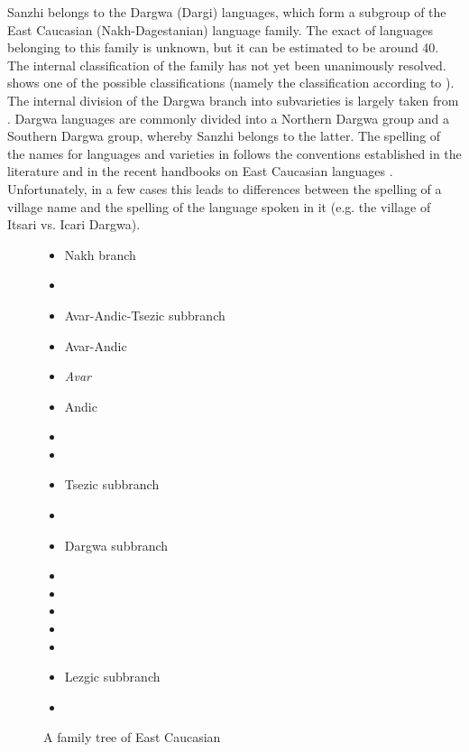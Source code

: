 Sanzhi belongs to the Dargwa (Dargi) languages, which form a subgroup of the East Caucasian (Nakh-Dagestanian) language family. The exact  of languages belonging to this family is unknown, but it can be estimated to be around 40. The internal classification of the family has not yet been unanimously resolved.  shows one of the possible classifications (namely the classification according to \citealt[xi]{Kibrik1996}). The internal division of the Dargwa branch into subvarieties is largely taken from \citet{Korjakov2006}. Dargwa languages are commonly divided into a Northern Dargwa group and a Southern Dargwa group, whereby Sanzhi belongs to the latter. The spelling of the names for languages and varieties in   follows the conventions established in the literature and in the recent handbooks on East Caucasian languages \citep{PolinskyInPress, KoryakovEtAllInPreparation}. Unfortunately, in a few cases this leads to differences between the spelling of a village name and the spelling of the language spoken in it (e.g. the village of Itsari vs. Icari Dargwa).
%
\begin{figure}
	\caption{A family tree of East Caucasian}
	\label{fig:classificationtree}

	\small
	\begin{itemize}
		\item[]	Nakh branch
		\item[]	\qquad{}

		\item[]	Avar-Andic-Tsezic subbranch
		\item[]	\qquad Avar-Andic
		\item[] \qquad\qquad \textit{Avar}
		\item[]	\qquad\qquad Andic
		\item[]	\qquad\qquad\qquad{} 
		\item[]	\qquad\qquad\qquad{}

		\item[]	\qquad Tsezic subbranch
		\item[]	\qquad\qquad{}

		\item[]	Dargwa subbranch
		\item[]	\qquad{}
		\item[]	\qquad{}
		\item[]	\qquad{}

		\item[]	
		\item[]	

		\item[]	Lezgic subbranch
		\item[]	\qquad{}
	\end{itemize}
\end{figure}


